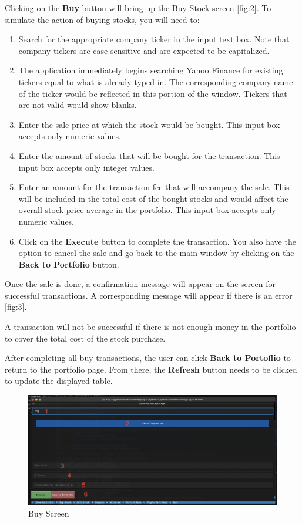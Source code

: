 \documentclass{article}
\begin{document}
Clicking on the \textbf{Buy} button will bring up the Buy Stock screen \autoref{fig:2}. To simulate the action of buying stocks, you will need to:

\begin{enumerate}
    \item Search for the appropriate company ticker in the input text box. Note that company tickers are case-sensitive and are expected to be capitalized. 
    \item The application immediately begins searching Yahoo Finance for existing tickers equal to what is already typed in. The corresponding company name of the ticker would be reflected in this portion of the window. Tickers that are not valid would show blanks.
    \item Enter the sale price at which the stock would be bought. This input box accepts only numeric values. 
    \item Enter the amount of stocks that will be bought for the transaction. This input box accepts only integer values.
    \item Enter an amount for the transaction fee that will accompany the sale. This will be included in the total cost of the bought stocks and would affect the overall stock price average in the portfolio. This input box accepts only numeric values.
    \item Click on the \textbf{Execute} button to complete the transaction. You also have the option to cancel the sale and go back to the main window by clicking on the \textbf{Back to Portfolio} button.
\end{enumerate}

    Once the sale is done, a confirmation message will appear on the screen for successful transactions. A corresponding message will appear if there is an error \ref{fig:3}. 
    
    A transaction will not be successful if there is not enough money in the portfolio to cover the total cost of the stock purchase. 

    After completing all buy transactions, the user can click \textbf{Back to Portoflio} to return to the portfolio page. From there, the \textbf{Refresh} button needs to be clicked to update the displayed table.
 
\begin{figure}
    \centering
    \includegraphics[width=1\linewidth]{BuyScreen.png}
    \caption{Buy Screen}
    \label{fig:2}
\end{figure}
\end{document}
